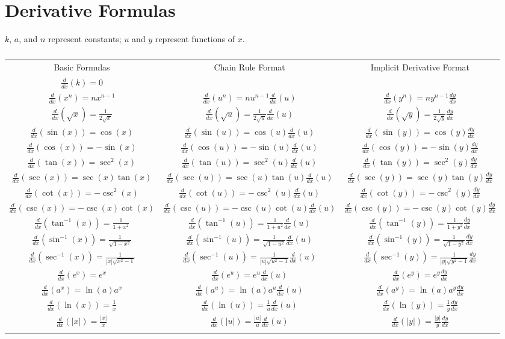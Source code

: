 \documentclass[12pt,]{book}
\theoremstyle{plain}
\theoremstyle{definition}
\theoremstyle{definition}
\theoremstyle{definition}
\theoremstyle{definition}
\theoremstyle{definition}
\numberwithin{equation}{section}
\newcommand{\hrulethin}  {\noalign{\hrule height 0.04em}}
\newcommand{\hrulemedium}{\noalign{\hrule height 0.07em}}
\newcommand{\hrulethick} {\noalign{\hrule height 0.11em}}
\newcommand{\fe}[2]{#1\mathopen{}\left(#2\right)\mathclose{}}
\newcommand{\lz}[2]{\frac{d#1}{d#2}}
\newcommand{\lzoo}[2]{{\frac{d}{d#1}}{\left(#2\right)}}
\newcommand{\abs}[1]{\left|#1\right|}
\begin{document}
\chapter[{Derivative Formulas}]{Derivative Formulas}\label{appendix-derivative-formulas}
\(k\), \(a\), and \(n\) represent constants; \(u\) and \(y\) represent functions of \(x\).%
\leavevmode%
\begin{table}
\centering
\begin{tabular}{ccc}\hrulethick
Basic Formulas&Chain Rule Format&Implicit Derivative Format\tabularnewline\hrulemedium
\(\lzoo{x}{k}=0\)&&\tabularnewline\hrulethin
\(\lzoo{x}{x^n}=nx^{n-1}\)&\(\lzoo{x}{u^n}=nu^{n-1}\lzoo{x}{u}\)&\(\lzoo{x}{y^n}=ny^{n-1}\lz{y}{x}\)\tabularnewline\hrulethin
\(\lzoo{x}{\sqrt{x}}=\frac{1}{2\sqrt{x}}\)&\(\lzoo{x}{\sqrt{u}}=\frac{1}{2\sqrt{u}}\lzoo{x}{u}\)&\(\lzoo{x}{\sqrt{y}}=\frac{1}{2\sqrt{y}}\lz{y}{x}\)\tabularnewline\hrulethin
\(\lzoo{x}{\fe{\sin}{x}}=\fe{\cos}{x}\)&\(\lzoo{x}{\fe{\sin}{u}}=\fe{\cos}{u}\lzoo{x}{u}\)&\(\lzoo{x}{\fe{\sin}{y}}=\fe{\cos}{y}\lz{y}{x}\)\tabularnewline\hrulethin
\(\lzoo{x}{\fe{\cos}{x}}=-\fe{\sin}{x}\)&\(\lzoo{x}{\fe{\cos}{u}}=-\fe{\sin}{u}\lzoo{x}{u}\)&\(\lzoo{x}{\fe{\cos}{y}}=-\fe{\sin}{y}\lz{y}{x}\)\tabularnewline\hrulethin
\(\lzoo{x}{\fe{\tan}{x}}=\fe{\sec^2}{x}\)&\(\lzoo{x}{\fe{\tan}{u}}=\fe{\sec^2}{u}\lzoo{x}{u}\)&\(\lzoo{x}{\fe{\tan}{y}}=\fe{\sec^2}{y}\lz{y}{x}\)\tabularnewline\hrulethin
\(\lzoo{x}{\fe{\sec}{x}}=\fe{\sec}{x}\fe{\tan}{x}\)&\(\lzoo{x}{\fe{\sec}{u}}=\fe{\sec}{u}\fe{\tan}{u}\lzoo{x}{u}\)&\(\lzoo{x}{\fe{\sec}{y}}=\fe{\sec}{y}\fe{\tan}{y}\lz{y}{x}\)\tabularnewline\hrulethin
\(\lzoo{x}{\fe{\cot}{x}}=-\fe{\csc^2}{x}\)&\(\lzoo{x}{\fe{\cot}{u}}=-\fe{\csc^2}{u}\lzoo{x}{u}\)&\(\lzoo{x}{\fe{\cot}{y}}=-\fe{\csc^2}{y}\lz{y}{x}\)\tabularnewline\hrulethin
\(\lzoo{x}{\fe{\csc}{x}}=-\fe{\csc}{x}\fe{\cot}{x}\)&\(\lzoo{x}{\fe{\csc}{u}}=-\fe{\csc}{u}\fe{\cot}{u}\lzoo{x}{u}\)&\(\lzoo{x}{\fe{\csc}{y}}=-\fe{\csc}{y}\fe{\cot}{y}\lz{y}{x}\)\tabularnewline\hrulethin
\(\lzoo{x}{\fe{\tan^{-1}}{x}}=\frac{1}{1+x^2}\)&\(\lzoo{x}{\fe{\tan^{-1}}{u}}=\frac{1}{1+u^2}\lzoo{x}{u}\)&\(\lzoo{x}{\fe{\tan^{-1}}{y}}=\frac{1}{1+y^2}\lz{y}{x}\)\tabularnewline\hrulethin
\(\lzoo{x}{\fe{\sin^{-1}}{x}}=\frac{1}{\sqrt{1-x^2}}\)&\(\lzoo{x}{\fe{\sin^{-1}}{u}}=\frac{1}{\sqrt{1-u^2}}\lzoo{x}{u}\)&\(\lzoo{x}{\fe{\sin^{-1}}{y}}=\frac{1}{\sqrt{1-y^2}}\lz{y}{x}\)\tabularnewline\hrulethin
\(\lzoo{x}{\fe{\sec^{-1}}{x}}=\frac{1}{\abs{x}\sqrt{x^2-1}}\)&\(\lzoo{x}{\fe{\sec^{-1}}{u}}=\frac{1}{\abs{u}\sqrt{u^2-1}}\lzoo{x}{u}\)&\(\lzoo{x}{\fe{\sec^{-1}}{y}}=\frac{1}{\abs{y}\sqrt{y^2-1}}\lz{y}{x}\)\tabularnewline\hrulethin
\(\lzoo{x}{e^x}=e^x\)&\(\lzoo{x}{e^u}=e^u\lzoo{x}{u}\)&\(\lzoo{x}{e^y}=e^y\lz{y}{x}\)\tabularnewline\hrulethin
\(\lzoo{x}{a^x}=\fe{\ln}{a}a^x\)&\(\lzoo{x}{a^u}=\fe{\ln}{a}a^u\lzoo{x}{u}\)&\(\lzoo{x}{a^y}=\fe{\ln}{a}a^y\lz{y}{x}\)\tabularnewline\hrulethin
\(\lzoo{x}{\fe{\ln}{x}}=\frac{1}{x}\)&\(\lzoo{x}{\fe{\ln}{u}}=\frac{1}{u}\lzoo{x}{u}\)&\(\lzoo{x}{\fe{\ln}{y}}=\frac{1}{y}\lz{y}{x}\)\tabularnewline\hrulethin
\(\lzoo{x}{\abs{x}}=\frac{\abs{x}}{x}\)&\(\lzoo{x}{\abs{u}}=\frac{\abs{u}}{u}\lzoo{x}{u}\)&\(\lzoo{x}{\abs{y}}=\frac{\abs{y}}{y}\lz{y}{x}\)\tabularnewline\hrulethick
\end{tabular}
\caption{\label{table-15}}
\end{table}
\end{document}
